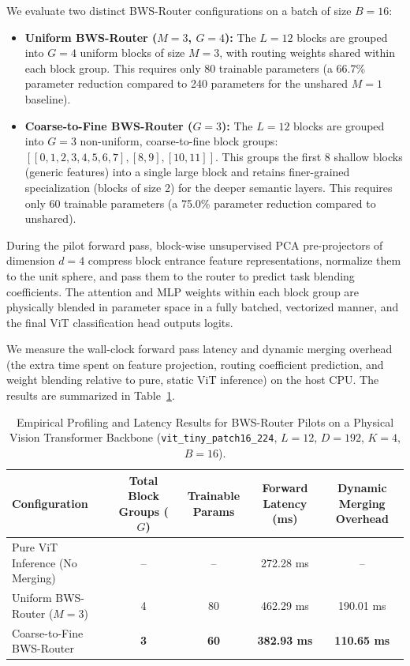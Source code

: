 We evaluate two distinct BWS-Router configurations on a batch of size $B=16$:
\begin{itemize}
    \item \textbf{Uniform BWS-Router ($M=3$, $G=4$):} The $L=12$ blocks are grouped into $G=4$ uniform blocks of size $M=3$, with routing weights shared within each block group. This requires only 80 trainable parameters (a 66.7\% parameter reduction compared to 240 parameters for the unshared $M=1$ baseline).
    \item \textbf{Coarse-to-Fine BWS-Router ($G=3$):} The $L=12$ blocks are grouped into $G=3$ non-uniform, coarse-to-fine block groups: $[[0, 1, 2, 3, 4, 5, 6, 7], [8, 9], [10, 11]]$. This groups the first 8 shallow blocks (generic features) into a single large block and retains finer-grained specialization (blocks of size 2) for the deeper semantic layers. This requires only 60 trainable parameters (a 75.0\% parameter reduction compared to unshared).
\end{itemize}

During the pilot forward pass, block-wise unsupervised PCA pre-projectors of dimension $d=4$ compress block entrance feature representations, normalize them to the unit sphere, and pass them to the router to predict task blending coefficients. The attention and MLP weights within each block group are physically blended in parameter space in a fully batched, vectorized manner, and the final ViT classification head outputs logits.

We measure the wall-clock forward pass latency and dynamic merging overhead (the extra time spent on feature projection, routing coefficient prediction, and weight blending relative to pure, static ViT inference) on the host CPU. The results are summarized in Table~\ref{tab:vit_pilot_results}.

\begin{table}[h]
\centering
\caption{Empirical Profiling and Latency Results for BWS-Router Pilots on a Physical Vision Transformer Backbone (\texttt{vit\_tiny\_patch16\_224}, $L=12$, $D=192$, $K=4$, $B=16$).}
\label{tab:vit_pilot_results}
\footnotesize
\begin{tabular}{lcccc}
\toprule
\textbf{Configuration} & \textbf{Total Block Groups ($G$)} & \textbf{Trainable Params} & \textbf{Forward Latency (ms)} & \textbf{Dynamic Merging Overhead} \\ \midrule
Pure ViT Inference (No Merging) & -- & -- & 272.28 ms & -- \\
Uniform BWS-Router ($M=3$) & 4 & 80 & 462.29 ms & 190.01 ms \\
Coarse-to-Fine BWS-Router & \textbf{3} & \textbf{60} & \textbf{382.93 ms} & \textbf{110.65 ms} \\
\bottomrule
\end{tabular}
\end{table}

